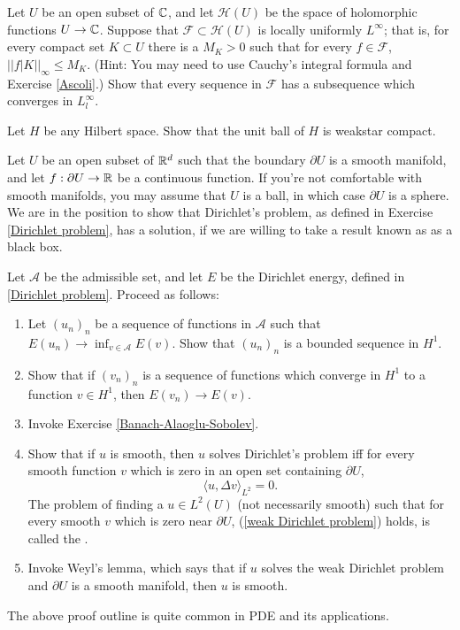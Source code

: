 \begin{exercise}
\label{Montel}
Let $U$ be an open subset of $\mathbb{C}$, and let $\mathcal H(U)$ be the space of holomorphic functions $U \to \mathbb{C}$.
Suppose that $\mathcal F \subset \mathcal H(U)$ is locally uniformly $L^\infty$; that is, for every compact set $K \subset U$ there is a $M_K > 0$ such that for every $f \in \mathcal F$, $||f|K||_\infty \leq M_K$.
(Hint: You may need to use Cauchy's integral formula and Exercise \ref{Ascoli}.)
Show that every sequence in $\mathcal F$ has a subsequence which converges in $L^\infty_l$.
\end{exercise}

\begin{exercise}
\label{Banach-Alaoglu-Sobolev}
Let $H$ be any Hilbert space. Show that the unit ball of $H$ is weakstar compact.
\end{exercise}

\begin{exercise}
\label{Dirichlet problem 2}
Let $U$ be an open subset of $\mathbb{R}^d$ such that the boundary $\partial U$ is a smooth manifold, and let $f: \partial U \to \mathbb{R}$ be a continuous function.
If you're not comfortable with smooth manifolds, you may assume that $U$ is a ball, in which case $\partial U$ is a sphere.
We are in the position to show that Dirichlet's problem, as defined in Exercise \ref{Dirichlet problem}, has a solution, if we are willing to take a result known as  as a black box.

Let $\mathcal A$ be the admissible set, and let $E$ be the Dirichlet energy, defined in \ref{Dirichlet problem}.
Proceed as follows:
\begin{enumerate}
\item Let $(u_n)_n$ be a sequence of functions in $\mathcal A$ such that $E(u_n) \to \inf_{v \in \mathcal A} E(v)$.
Show that $(u_n)_n$ is a bounded sequence in $H^1$.
\item Show that if $(v_n)_n$ is a sequence of functions which converge in $H^1$ to a function $v \in H^1$, then $E(v_n) \to E(v)$.
\item Invoke Exercise \ref{Banach-Alaoglu-Sobolev}.
\item Show that if $u$ is smooth, then $u$ solves Dirichlet's problem iff for every smooth function $v$ which is zero in an open set containing $\partial U$,
\begin{equation}
\label{weak Dirichlet problem}
\langle u, \Delta v\rangle_{L^2} = 0.
\end{equation}
The problem of finding a $u \in L^2(U)$ (not necessarily smooth) such that for every smooth $v$ which is zero near $\partial U$, (\ref{weak Dirichlet problem}) holds, is called the .
\item Invoke Weyl's lemma, which says that if $u$ solves the weak Dirichlet problem and $\partial U$ is a smooth manifold, then $u$ is smooth.
\end{enumerate}
The above proof outline is quite common in PDE and its applications.
\end{exercise}


